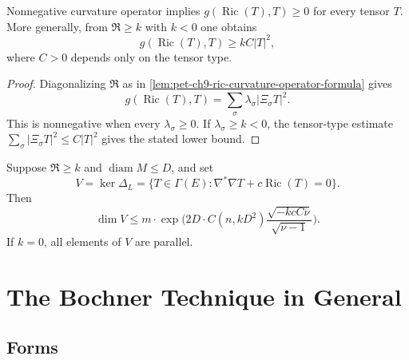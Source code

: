 \begin{corollary}
  \label{cor:pet-ch9-ric-nonneg-curvature-operator}

  Nonnegative curvature operator implies
  $g(\operatorname{Ric}(T),T)\ge0$ for every tensor $T$.  More generally, from
  $\mathfrak R\ge k$ with $k<0$ one obtains
  \[
    g(\operatorname{Ric}(T),T)\ge kC|T|^2,
  \]
  where $C>0$ depends only on the tensor type.
\end{corollary}
\begin{proof}
  \sketch
  Diagonalizing \(\mathfrak R\) as in
  \cref{lem:pet-ch9-ric-curvature-operator-formula} gives
  \[
    g(\operatorname{Ric}(T),T)=\sum_\sigma\lambda_\sigma|\Xi_\sigma T|^2.
  \]
  This is nonnegative when every \(\lambda_\sigma\ge0\).  If
  \(\lambda_\sigma\ge k<0\), the tensor-type estimate
  \(\sum_\sigma|\Xi_\sigma T|^2\le C|T|^2\) gives the stated lower bound.
\end{proof}

\begin{theorem}
  \label{thm:pet-ch9-lichnerowicz-dimension-estimate}

  Suppose $\mathfrak R\ge k$ and $\operatorname{diam}M\le D$, and set
  \[
    V=\ker\Delta_L
      =\{T\in\Gamma(E):\nabla^*\nabla T+c\operatorname{Ric}(T)=0\}.
  \]
  Then
  \[
    \dim V\le
    m\cdot\exp\Big(2D\cdot C(n,kD^2)
      \frac{\sqrt{-kcC\nu}}{\sqrt{\nu-1}}\Big).
  \]
  If $k=0$, all elements of $V$ are parallel.
\end{theorem}

\section{The Bochner Technique in General}

\subsection{Forms}

